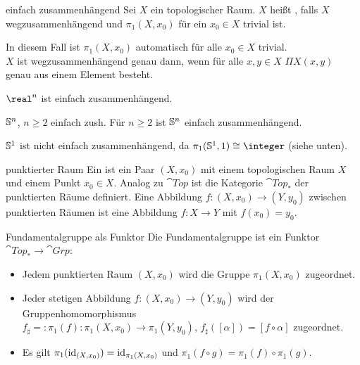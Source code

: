 \linie
\pagebreak

\begin{Def}{einfach zusammenhängend}
    Sei $X$ ein topologischer Raum.
    $X$ heißt , falls $X$ wegzusammenhängend
    und $\pi_1(X, x_0)$ für ein $x_0 \in X$ trivial ist.
\end{Def}

\begin{Bem}
    In diesem Fall ist $\pi_1(X, x_0)$ automatisch
    für alle $x_0 \in X$ trivial. \\
    $X$ ist wegzusammenhängend genau dann, wenn für alle $x, y \in X$
    $\Pi X(x, y)$ genau aus einem Element besteht.
\end{Bem}

\begin{Bsp}
    $\real^n$ ist einfach zusammenhängend.
\end{Bsp}

\begin{Satz}{$\mathbb{S}^n$, $n \ge 2$ einfach zush.}
    Für $n \ge 2$ ist $\mathbb{S}^n$ einfach zusammenhängend.
\end{Satz}

\begin{Bem}
    $\mathbb{S}^1$ ist nicht einfach zusammenhängend, da
    $\pi_1(\sphere^1, 1) \cong \integer$ (siehe unten).
\end{Bem}

\linie

\begin{Def}{punktierter Raum}
    Ein  ist ein Paar $(X, x_0)$ mit
    einem topologischen Raum $X$ und einem Punkt $x_0 \in X$.
    Analog zu $\cat{Top}$ ist die Kategorie $\cat{Top}_\ast$ der punktierten
    Räume definiert.
    Eine Abbildung $f\colon (X, x_0) \rightarrow (Y, y_0)$ zwischen
    punktierten Räumen ist eine Abbildung $f\colon X \rightarrow Y$ mit
    $f(x_0) = y_0$.
\end{Def}

\begin{Satz}{Fundamentalgruppe als Funktor}
    Die Fundamentalgruppe ist ein Funktor
    $\cat{Top}_\ast \rightarrow \cat{Grp}$:
    \begin{itemize}
        \item
        Jedem punktierten Raum $(X, x_0)$ wird die Gruppe $\pi_1(X, x_0)$
        zugeordnet.

        \item
        Jeder stetigen Abbildung $f\colon (X, x_0) \rightarrow (Y, y_0)$ wird
        der Gruppenhomomorphismus \\
        $f_\sharp =: \pi_1(f)\colon \pi_1(X, x_0) \rightarrow \pi_1(Y, y_0)$,
        $f_\sharp([\alpha]) = [f \circ \alpha]$ zugeordnet.

        \item
        Es gilt $\pi_1(\operatorname{id}_{(X, x_0)}) = \operatorname{id}_{\pi_1(X, x_0)}$ und
        $\pi_1(f \circ g) = \pi_1(f) \circ \pi_1(g)$.
    \end{itemize}
\end{Satz}

